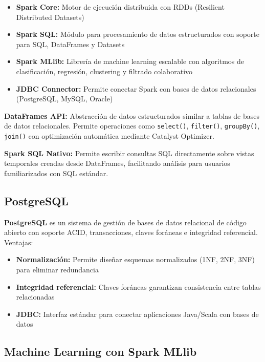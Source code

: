 \documentclass[12pt,a4paper]{article}
\begin{document}
\begin{itemize}
    \item \textbf{Spark Core:} Motor de ejecución distribuida con RDDs (Resilient Distributed Datasets)
    \item \textbf{Spark SQL:} Módulo para procesamiento de datos estructurados con soporte para SQL, DataFrames y Datasets
    \item \textbf{Spark MLlib:} Librería de machine learning escalable con algoritmos de clasificación, regresión, clustering y filtrado colaborativo
    \item \textbf{JDBC Connector:} Permite conectar Spark con bases de datos relacionales (PostgreSQL, MySQL, Oracle)
\end{itemize}

\textbf{DataFrames API:} Abstracción de datos estructurados similar a tablas de bases de datos relacionales. Permite operaciones como \texttt{select()}, \texttt{filter()}, \texttt{groupBy()}, \texttt{join()} con optimización automática mediante Catalyst Optimizer.

\textbf{Spark SQL Nativo:} Permite escribir consultas SQL directamente sobre vistas temporales creadas desde DataFrames, facilitando análisis para usuarios familiarizados con SQL estándar.

\subsection{PostgreSQL}

\textbf{PostgreSQL} es un sistema de gestión de bases de datos relacional de código abierto con soporte ACID, transacciones, claves foráneas e integridad referencial. Ventajas:

\begin{itemize}
    \item \textbf{Normalización:} Permite diseñar esquemas normalizados (1NF, 2NF, 3NF) para eliminar redundancia
    \item \textbf{Integridad referencial:} Claves foráneas garantizan consistencia entre tablas relacionadas
    \item \textbf{JDBC:} Interfaz estándar para conectar aplicaciones Java/Scala con bases de datos
\end{itemize}

\subsection{Machine Learning con Spark MLlib}
\end{document}
